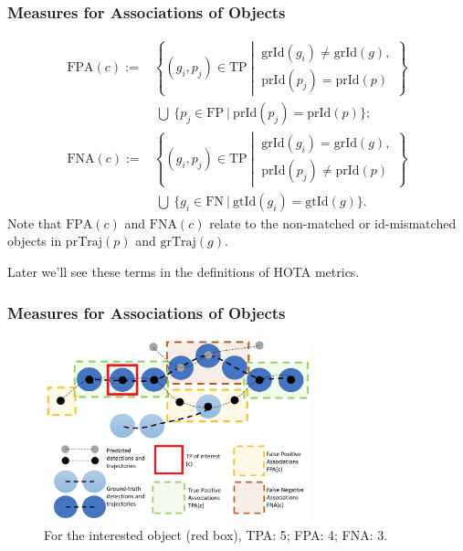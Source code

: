 \documentclass[slidetop, mathserif]{beamer}
\begin{document}
\begin{frame}
	\frametitle{Measures for Associations of Objects}
	
	\vspace{-20pt}
	\begin{align*}
		\text{FPA}(c) := &             
		\left\{(g_i, p_j)\in\text{TP}\ \left|\ 
		\begin{array}{c}
		\text{grId}(g_i) \neq \text{grId}(g), \\
		\text{prId}(p_j) = \text{prId}(p)
		\end{array}\right.
		\right\} \\
		                 & ~ \bigcup ~ 
		\Big\{p_j\in\text{FP}\ |\ 
		\text{prId}(p_j) = \text{prId}(p)
		\Big\}; \\
		\text{FNA}(c) := &             
		\left\{(g_i, p_j)\in\text{TP}\ \left|\ 
		\begin{array}{c}
		\text{grId}(g_i) = \text{grId}(g), \\
		\text{prId}(p_j) \neq \text{prId}(p)
		\end{array}\right.
		\right\} \\
		                 & ~ \bigcup ~ 
		\Big\{g_i\in\text{FN}\ |\ 
		\text{gtId}(g_i) = \text{gtId}(g)
		\Big\}.
	\end{align*}
	Note that $\text{FPA}(c)$ and $\text{FNA}(c)$ relate to the non-matched or id-mismatched
	objects in $\text{prTraj}(p)$ and $\text{grTraj}(g)$.

	Later we'll see these terms in the definitions of HOTA metrics.
	
\end{frame}

\begin{frame}
	\frametitle{Measures for Associations of Objects}
	\begin{figure}
		\includegraphics[width=220pt]{pics/fig8.png}
		\caption{For the interested object (red box), TPA: 5; FPA: 4; FNA: 3.}
	\end{figure}
\end{frame}
\end{document}
